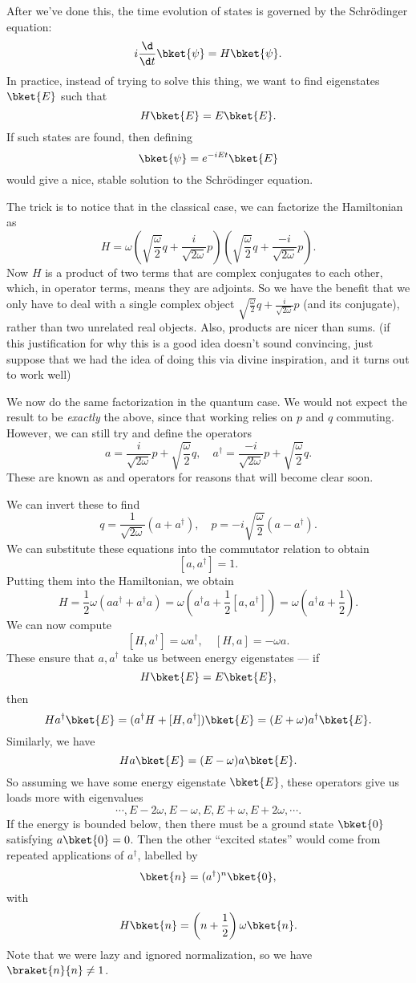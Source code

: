 \documentclass[a4paper]{article}
\begin{document}
After we've done this, the time evolution of states is governed by the Schr\"odinger equation:
\[
  i\frac{\d}{\d t}\bket{\psi} = H\bket{\psi}.
\]
In practice, instead of trying to solve this thing, we want to find eigenstates $\bket{E}$ such that
\[
  H \bket{E} = E\bket{E}.
\]
If such states are found, then defining
\[
  \bket{\psi} = e^{-iEt}\bket{E}
\]
would give a nice, stable solution to the Schr\"odinger equation.

The trick is to notice that in the classical case, we can factorize the Hamiltonian as
\[
  H = \omega \left(\sqrt{\frac{\omega}{2}}q + \frac{i}{\sqrt{2\omega}}p\right)\left(\sqrt{\frac{\omega}{2}}q + \frac{-i}{\sqrt{2\omega}}p\right).
\]
Now $H$ is a product of two terms that are complex conjugates to each other, which, in operator terms, means they are adjoints. So we have the benefit that we only have to deal with a single complex object $\sqrt{\frac{\omega}{2}}q + \frac{i}{\sqrt{2\omega}}p$ (and its conjugate), rather than two unrelated real objects. Also, products are nicer than sums. (if this justification for why this is a good idea doesn't sound convincing, just suppose that we had the idea of doing this via divine inspiration, and it turns out to work well)

We now do the same factorization in the quantum case. We would not expect the result to be \emph{exactly} the above, since that working relies on $p$ and $q$ commuting. However, we can still try and define the operators
\[
  a = \frac{i}{\sqrt{2 \omega}}p + \sqrt{\frac{\omega}{2}}q,\quad a^\dagger = \frac{-i}{\sqrt{2\omega}}p + \sqrt{\frac{\omega}{2}}q.
\]
These are known as  and  operators for reasons that will become clear soon.

We can invert these to find
\[
  q = \frac{1}{\sqrt{2\omega}}(a + a^\dagger),\quad p = -i\sqrt{\frac{\omega}{2}} (a - a^\dagger).
\]
We can substitute these equations into the commutator relation to obtain
\[
  [a, a^\dagger] = 1.
\]
Putting them into the Hamiltonian, we obtain
\[
  H = \frac{1}{2}\omega(a a^\dagger + a^\dagger a) = \omega\left(a^\dagger a + \frac{1}{2}[a, a^\dagger]\right) = \omega \left(a^\dagger a + \frac{1}{2}\right).
\]
We can now compute
\[
  [H, a^\dagger] = \omega a^\dagger,\quad [H, a] = -\omega a.
\]
These ensure that $a, a^\dagger$ take us between energy eigenstates --- if
\[
  H\bket{E} = E \bket{E},
\]
then
\[
  Ha^\dagger\bket{E} = (a^\dagger H + [H, a^\dagger]) \bket{E} = (E + \omega)a^\dagger \bket{E}.
\]
Similarly, we have
\[
  Ha\bket{E} = (E - \omega)a\bket{E}.
\]
So assuming we have some energy eigenstate $\bket{E}$, these operators give us loads more with eigenvalues
\[
  \cdots, E - 2\omega, E - \omega, E, E + \omega, E + 2\omega, \cdots.
\]
If the energy is bounded below, then there must be a ground state $\bket{0}$ satisfying $a \bket{0} = 0$. Then the other ``excited states'' would come from repeated applications of $a^\dagger$, labelled by
\[
  \bket{n} = (a^\dagger)^n \bket{0},
\]
with
\[
  H\bket{n} = \left(n + \frac{1}{2}\right)\omega \bket{n}.
\]
Note that we were lazy and ignored normalization, so we have $\braket{n}{n} \not= 1$.
\end{document}
